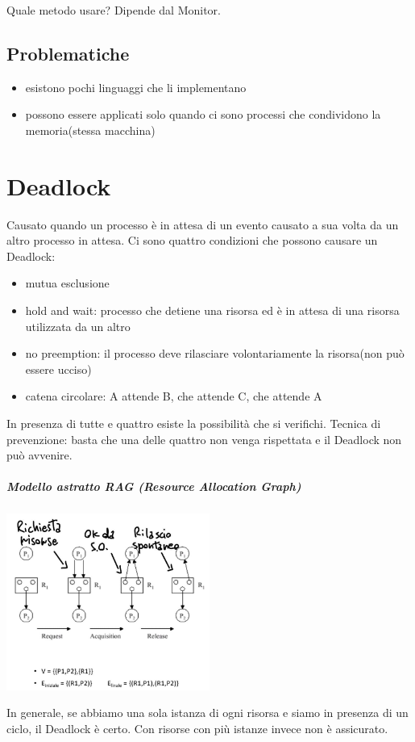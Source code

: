 \documentclass[a4paper, 12pt]{book}
\begin{document}
Quale metodo usare? Dipende dal Monitor.

\section{Problematiche}

\begin{itemize}
    \item esistono pochi linguaggi che li implementano
    \item possono essere applicati solo quando ci sono processi che condividono la memoria(stessa macchina)
\end{itemize}

\chapter{Deadlock}

Causato quando un processo è in attesa di un evento causato a sua volta da un altro processo in attesa.
Ci sono quattro condizioni che possono causare un Deadlock:

\begin{itemize}
    \item mutua esclusione
    \item hold and wait: processo che detiene una risorsa ed è in attesa di una risorsa utilizzata da un altro
    \item no preemption: il processo deve rilasciare volontariamente la risorsa(non può essere ucciso)
    \item catena circolare: A attende B, che attende C, che attende A
\end{itemize}
In presenza di tutte e quattro esiste la possibilità che si verifichi.
Tecnica di prevenzione: basta che una delle quattro non venga rispettata e il Deadlock non può avvenire.

\paragraph{Modello astratto RAG (Resource Allocation Graph)}

\begin{center}
    \includegraphics[width=0.5\textwidth]{rag.jpg}    
\end{center}
In generale, se abbiamo una sola istanza di ogni risorsa e siamo in presenza di un ciclo, il Deadlock è certo.
Con risorse con più istanze invece non è assicurato.
\end{document}
